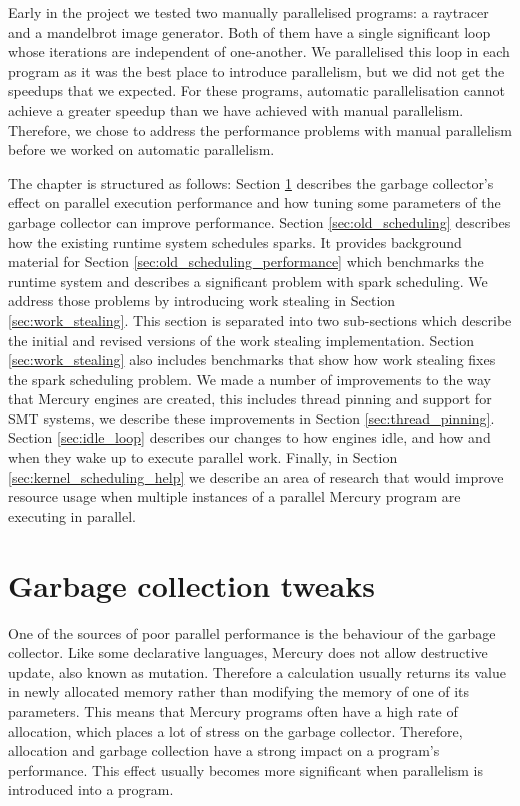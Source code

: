 

Early in the project
we tested two manually parallelised programs:
a raytracer and a mandelbrot image generator.
Both of them have a single significant loop
whose iterations are independent of one-another.
We parallelised this loop in each program as it was the best place to
introduce parallelism,
but we did not get the speedups that we expected.
For these programs, automatic parallelisation cannot achieve
a greater speedup than we have achieved with manual parallelism.
Therefore,
we chose to address the performance problems with manual parallelism
before we worked on automatic parallelism.

The chapter is structured as follows:
Section \ref{sec:gc} describes the garbage collector's effect on parallel
execution performance and how tuning some parameters of the garbage
collector can improve performance.
Section \ref{sec:old_scheduling} describes how the existing runtime
system schedules sparks.
It provides background material for Section
\ref{sec:old_scheduling_performance}
which benchmarks the runtime system and describes a significant problem with
spark scheduling.
We address those problems by introducing work stealing in Section
\ref{sec:work_stealing}.
This section is separated into two sub-sections
which describe the initial and revised versions of the work stealing
implementation.
Section \ref{sec:work_stealing} also includes benchmarks that show
how work stealing fixes the spark scheduling problem.
We made a number of improvements to the way that Mercury engines are created,
this includes thread pinning and support for SMT systems,
we describe these improvements in Section \ref{sec:thread_pinning}.
Section \ref{sec:idle_loop} describes our changes to how engines idle,
and how and when they wake up to execute parallel work.
Finally, in Section \ref{sec:kernel_scheduling_help}
we describe an area of research that would improve resource usage when
multiple instances of a parallel Mercury program are executing in parallel.

\section{Garbage collection tweaks}
\label{sec:gc}

One of the sources of poor parallel performance is the behaviour of the
garbage collector.
Like some declarative languages,
Mercury does not allow destructive update, also known as mutation.%
Therefore a calculation usually returns its value in newly allocated memory
rather than modifying the memory of one of its parameters.
This means that Mercury programs often have a high rate of allocation,
which places a lot of stress on the garbage collector.
Therefore,
allocation and garbage collection have a strong impact on a program's
performance.
This effect usually becomes more significant when parallelism is introduced into a
program.

